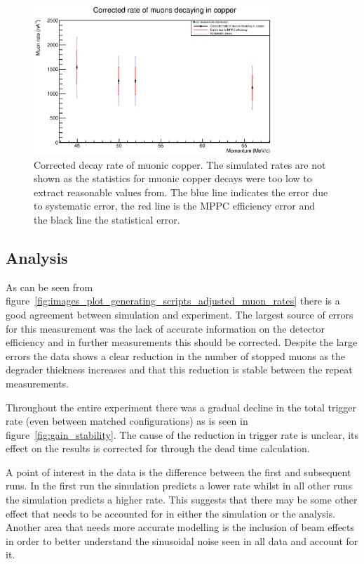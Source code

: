 \begin{figure}[hptb]
  \centering
    \includegraphics[width=0.8\textwidth]{images/plot_generating_scripts/adjusted_muon_rates_cu.eps}
  \caption{Corrected decay rate of muonic copper. The simulated rates are not shown as the statistics for muonic copper decays were too low to extract reasonable values from. The blue line indicates the error due to systematic error, the red line is the MPPC efficiency error and the black line the statistical error.}
  \label{fig:images_plot_generating_scripts_adjusted_muon_rates_cu}
\end{figure}

\subsection{Analysis} %
\label{sub:mom_analysis}
As can be seen from figure~\ref{fig:images_plot_generating_scripts_adjusted_muon_rates} there is a good agreement between simulation and experiment. The largest source of errors for this measurement was the lack of accurate information on the detector efficiency and in further measurements this should be corrected. Despite the large errors the data shows a clear reduction in the number of stopped muons as the degrader thickness increases and that this reduction is stable between the repeat measurements. 

Throughout the entire experiment there was a gradual decline in the total trigger rate (even between matched configurations) as is seen in figure~\ref{fig:gain_stability}. The cause of the reduction in trigger rate is unclear, its effect on the results is corrected for through the dead time calculation. 

A point of interest in the data is the difference between the first and subsequent runs. In the first run the simulation predicts a lower rate whilst in all other runs the simulation predicts a higher rate. This suggests that there may be some other effect that needs to be accounted for in either the simulation or the analysis. Another area that needs more accurate modelling is the inclusion of beam effects in order to better understand the sinusoidal noise seen in all data and account for it.

